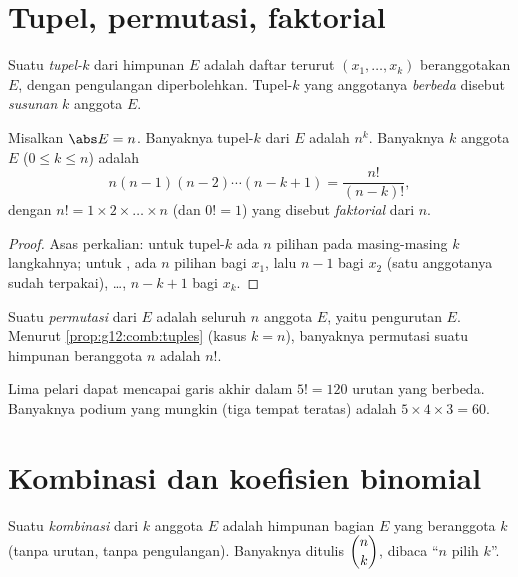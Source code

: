 \section{Tupel, permutasi, faktorial}

\begin{definition}[Tupel-$k$]\label{def:g12:comb:tuples}
Suatu \emph{tupel-$k$} dari himpunan $E$ adalah daftar terurut $(x_1, \dots, x_k)$
beranggotakan $E$, dengan pengulangan diperbolehkan. Tupel-$k$ yang anggotanya
\emph{berbeda} disebut \emph{susunan} $k$ anggota $E$.
\end{definition}

\begin{proposition}\label{prop:g12:comb:tuples}
Misalkan $\abs E = n$. Banyaknya tupel-$k$ dari $E$ adalah $n^k$. Banyaknya
 $k$ anggota $E$ ($0 \leq k \leq n$) adalah
\[
n(n-1)(n-2)\cdots(n-k+1) = \frac{n!}{(n-k)!},
\]
dengan $n! = 1 \times 2 \times \dots \times n$ (dan $0! = 1$) yang disebut
\emph{faktorial} dari $n$.
\end{proposition}

\begin{proof}
Asas perkalian: untuk tupel-$k$ ada $n$ pilihan pada masing-masing
$k$ langkahnya; untuk , ada $n$ pilihan bagi $x_1$, lalu $n - 1$ bagi
$x_2$ (satu anggotanya sudah terpakai), \dots, $n - k + 1$ bagi $x_k$.
\end{proof}

\begin{definition}[Permutasi]\label{def:g12:comb:permutation}
Suatu \emph{permutasi} dari $E$ adalah  seluruh $n$
anggota $E$, yaitu pengurutan $E$. Menurut
\cref{prop:g12:comb:tuples} (kasus $k = n$), banyaknya permutasi suatu
himpunan beranggota $n$ adalah $n!$.
\end{definition}

\begin{example}
Lima pelari dapat mencapai garis akhir dalam $5! = 120$ urutan yang berbeda.
Banyaknya podium yang mungkin (tiga tempat teratas) adalah $5 \times 4 \times 3 = 60$.
\end{example}

\section{Kombinasi dan koefisien binomial}

\begin{definition}[Kombinasi]\label{def:g12:comb:combination}
Suatu \emph{kombinasi} dari $k$ anggota $E$ adalah himpunan
bagian $E$ yang beranggota $k$ (tanpa urutan, tanpa pengulangan). Banyaknya ditulis
$\dbinom{n}{k}$, dibaca ``$n$ pilih $k$''.
\end{definition}


